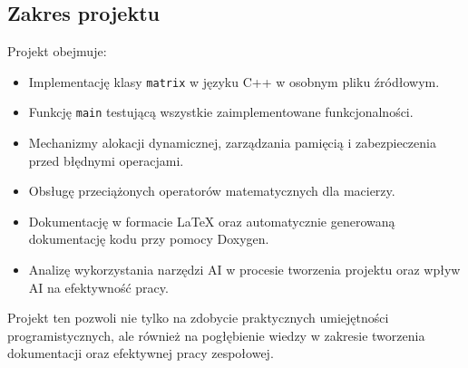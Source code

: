 \subsection{Zakres projektu}
Projekt obejmuje:
\begin{itemize}
  \item Implementację klasy \texttt{matrix} w języku C++ w osobnym pliku źródłowym.
  \item Funkcję \texttt{main} testującą wszystkie zaimplementowane funkcjonalności.
  \item Mechanizmy alokacji dynamicznej, zarządzania pamięcią i zabezpieczenia przed błędnymi operacjami.
  \item Obsługę przeciążonych operatorów matematycznych dla macierzy.
  \item Dokumentację w formacie LaTeX oraz automatycznie generowaną dokumentację kodu przy pomocy Doxygen.
  \item Analizę wykorzystania narzędzi AI w procesie tworzenia projektu oraz wpływ AI na efektywność pracy.
\end{itemize}

Projekt ten pozwoli nie tylko na zdobycie praktycznych umiejętności programistycznych, ale również na pogłębienie wiedzy w zakresie tworzenia dokumentacji oraz efektywnej pracy zespołowej.

